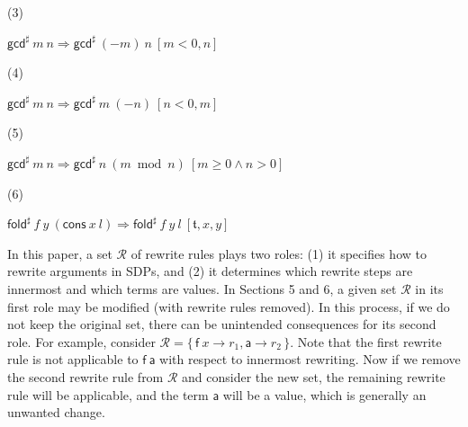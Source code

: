 \documentclass[10pt,a4paper]{amsart}
\begin{document}
 
 
\par\noindent  (3) 
 
${{{\mathsf{gcd}^{\sharp}}\ {m}}\ {n}}\Rightarrow{{{\mathsf{gcd}^{\sharp}}\ {(-m)}}\ {n}}\ [m<0,n]$\par
 
 
 
\par\noindent  (4) 
 
${{{\mathsf{gcd}^{\sharp}}\ {m}}\ {n}}\Rightarrow{{{\mathsf{gcd}^{\sharp}}\ {m}}\ {(-n)}}\ [n<0,m]$\par
 
 
 
\par\noindent  (5) 
 
${{{\mathsf{gcd}^{\sharp}}\ {m}}\ {n}}\Rightarrow{{{\mathsf{gcd}^{\sharp}}\ {n}}\ {(m\bmod n)}}\ [m\geq 0\wedge n>0]$\par
 
 
 
\par\noindent  (6) 
 
${{{{\mathsf{fold}^{\sharp}}\ {f}}\ {y}}\ {({{\mathsf{cons}}\ {x}}\ {l})}}\Rightarrow{{{{\mathsf{fold}^{\sharp}}\ {f}}\ {y}}\ {l}}\ [\mathfrak{t},x,y]$\par
 
 
  
 
 
 
In this paper, a set $\mathcal{R}$ of rewrite rules plays two roles: (1) it specifies how to rewrite arguments in SDPs, and (2) it determines which rewrite steps are innermost and which terms are values. In Sections 5 and 6, a given set $\mathcal{R}$ in its first role may be modified (with rewrite rules removed). In this process, if we do not keep the original set, there can be unintended consequences for its second role. For example, consider $\mathcal{R}=\{\,{\mathsf{f}}\ {x}\rightarrow r_{1},\mathsf{a}\rightarrow r_{2}\,\}$. Note that the first rewrite rule is not applicable to ${\mathsf{f}}\ {\mathsf{a}}$ with respect to innermost rewriting. Now if we remove the second rewrite rule from $\mathcal{R}$ and consider the new set, the remaining rewrite rule will be applicable, and the term $\mathsf{a}$ will be a value, which is generally an unwanted change.\par
 
\end{document}
